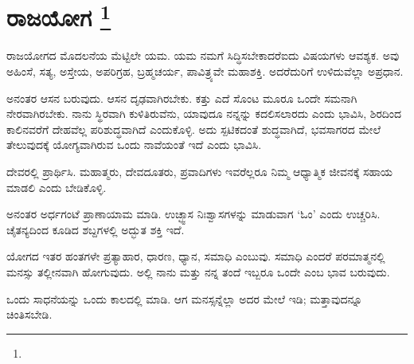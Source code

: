 
\chapter[ರಾಜಯೋಗ ]{ರಾಜಯೋಗ \protect\footnote{}}

ರಾಜಯೋಗದ ಮೊದಲನೆಯ ಮೆಟ್ಟಿಲೇ ಯಮ. ಯಮ ನಮಗೆ ಸಿದ್ಧಿಸಬೇಕಾದರೆ\break ಐದು ವಿಷಯಗಳು ಆವಶ್ಯಕ. ಅವು ಅಹಿಂಸೆ, ಸತ್ಯ, ಅಸ್ತೇಯ, ಅಪರಿಗ್ರಹ, ಬ್ರಹ್ಮಚರ್ಯ, ಪಾವಿತ್ರ್ಯವೇ ಮಹಾಶಕ್ತಿ. ಅದರೆದುರಿಗೆ ಉಳಿದುವೆಲ್ಲಾ ಅಪ್ರಧಾನ.

ಅನಂತರ ಆಸನ ಬರುವುದು. ಆಸನ ದೃಢವಾಗಿರಬೇಕು. ಕತ್ತು ಎದೆ ಸೊಂಟ ಮೂರೂ ಒಂದೇ ಸಮನಾಗಿ ನೇರವಾಗಿರಬೇಕು. ನಾನು ಸ್ಥಿರವಾಗಿ ಕುಳಿತಿರುವೆನು, ಯಾವುದೂ ನನ್ನನ್ನು ಕದಲಿಸಲಾರದು ಎಂದು ಭಾವಿಸಿ, ಶಿರದಿಂದ ಕಾಲಿನವರೆಗೆ ದೇಹವೆಲ್ಲ ಪರಿಶುದ್ಧವಾಗಿದೆ ಎಂದುಕೊಳ್ಳಿ. ಅದು ಸ್ಪಟಿಕದಂತೆ ಶುದ್ಧವಾಗಿದೆ, ಭವಸಾಗರದ ಮೇಲೆ ತೇಲುವುದಕ್ಕೆ ಯೋಗ್ಯವಾಗಿರುವ ಒಂದು ನಾವೆಯಂತೆ ಇದೆ ಎಂದು ಭಾವಿಸಿ.

ದೇವರಲ್ಲಿ ಪ್ರಾರ್ಥಿಸಿ. ಮಹಾತ್ಮರು, ದೇವದೂತರು, ಪ್ರವಾದಿಗಳು ಇವರೆಲ್ಲರೂ ನಿಮ್ಮ ಆಧ್ಯಾತ್ಮಿಕ ಜೀವನಕ್ಕೆ ಸಹಾಯ ಮಾಡಲಿ ಎಂದು ಬೇಡಿಕೊಳ್ಳಿ.

ಅನಂತರ ಅರ್ಧಗಂಟೆ ಪ್ರಾಣಾಯಾಮ ಮಾಡಿ. ಉಚ್ಛ್ವಾಸ ನಿಃಶ್ವಾಸಗಳನ್ನು ಮಾಡುವಾಗ ‘ಓಂ’ ಎಂದು ಉಚ್ಚರಿಸಿ. ಚೈತನ್ಯದಿಂದ ಕೂಡಿದ ಶಬ್ದಗಳಲ್ಲಿ ಅದ್ಭುತ ಶಕ್ತಿ ಇದೆ.

ಯೋಗದ ಇತರ ಹಂತಗಳೇ ಪ್ರತ್ಯಾಹಾರ, ಧಾರಣ, ಧ್ಯಾನ, ಸಮಾಧಿ ಎಂಬುವು. ಸಮಾಧಿ ಎಂದರೆ ಪರಮಾತ್ಮನಲ್ಲಿ ಮನಸ್ಸು ತಲ್ಲೀನವಾಗಿ ಹೋಗುವುದು. ಅಲ್ಲಿ ನಾನು ಮತ್ತು ನನ್ನ ತಂದೆ ಇಬ್ಬರೂ ಒಂದೇ ಎಂಬ ಭಾವ ಬರುವುದು.

ಒಂದು ಸಾಧನೆಯನ್ನು ಒಂದು ಕಾಲದಲ್ಲಿ ಮಾಡಿ. ಆಗ ಮನಸ್ಸನ್ನೆಲ್ಲಾ ಅದರ ಮೇಲೆ ಇಡಿ; ಮತ್ತಾವುದನ್ನೂ ಚಿಂತಿಸಬೇಡಿ.

